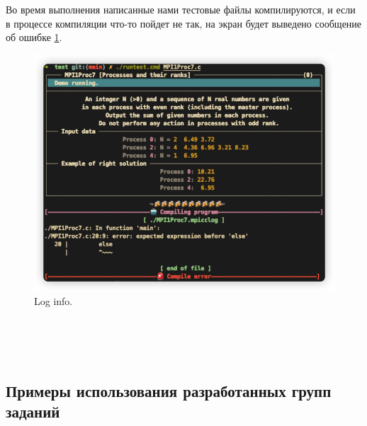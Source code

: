 Во время выполнения написанные нами тестовые файлы компилируются, и если в процессе компиляции что-то пойдет не так, на экран будет выведено сообщение об ошибке \ref{error}.
\begin{figure}[htbp]%
    \centering
    \includegraphics[width=1\linewidth]{images/error.jpg}%
    \caption{Log info.}%
    \label{error}%
\end{figure}
\\ \\ \\
\subsection{Примеры использования разработанных групп заданий}

